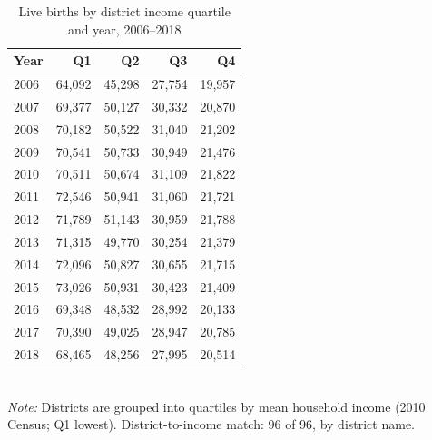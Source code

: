 \begin{table}[htbp]\centering
\caption{Live births by district income quartile and year, 2006--2018}
\label{tab:S6b_nascidos_renda}
\small
\begin{tabular}{lrrrr}
\toprule
Year & Q1 & Q2 & Q3 & Q4 \\
\midrule
2006 & 64,092 & 45,298 & 27,754 & 19,957 \\
2007 & 69,377 & 50,127 & 30,332 & 20,870 \\
2008 & 70,182 & 50,522 & 31,040 & 21,202 \\
2009 & 70,541 & 50,733 & 30,949 & 21,476 \\
2010 & 70,511 & 50,674 & 31,109 & 21,822 \\
2011 & 72,546 & 50,941 & 31,060 & 21,721 \\
2012 & 71,789 & 51,143 & 30,959 & 21,788 \\
2013 & 71,315 & 49,770 & 30,254 & 21,379 \\
2014 & 72,096 & 50,827 & 30,655 & 21,715 \\
2015 & 73,026 & 50,931 & 30,423 & 21,409 \\
2016 & 69,348 & 48,532 & 28,992 & 20,133 \\
2017 & 70,390 & 49,025 & 28,947 & 20,785 \\
2018 & 68,465 & 48,256 & 27,995 & 20,514 \\
\bottomrule
\end{tabular}
\\[3pt]{\footnotesize \textit{Note:} Districts are grouped into quartiles by mean household income (2010 Census; Q1 lowest). District-to-income match: 96 of 96, by district name.}
\end{table}
